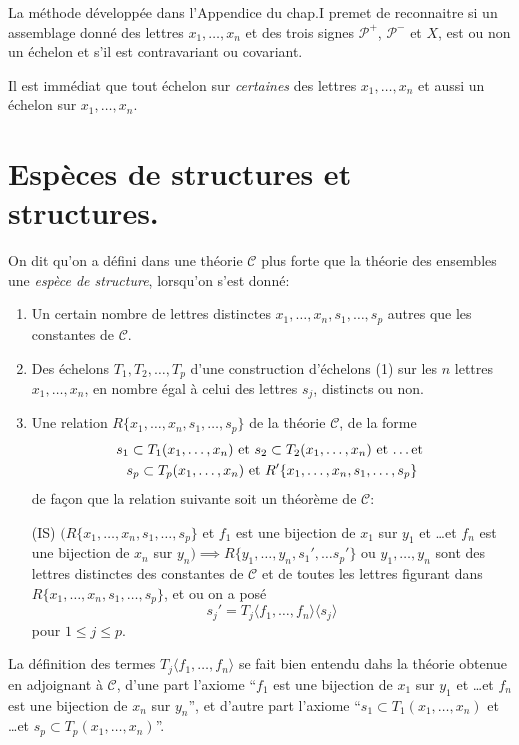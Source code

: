 \documentclass{article}
\newcommand{\C}{\mathcal{C}}
\newcommand{\Pp}{\mathcal{P}^+}
\newcommand{\Pm}{\mathcal{P}^-}
\begin{document}
La m\'ethode d\'evelopp\'ee dans l'Appendice du chap.I premet de
reconnaitre si un assemblage donn\'e des lettres $x_1, \dots, x_n$ et
des trois signes $\Pp$, $\Pm$ et $X$, est ou non un \'echelon et s'il
est contravariant ou covariant.

Il est imm\'ediat que tout \'echelon sur \emph{certaines} des lettres
$x_1, \dots, x_n$ et aussi un \'echelon sur $x_1, \dots, x_n$.

\section*{Esp\`eces de structures et structures.}

On dit qu'on a d\'efini dans une th\'eorie $\C$ plus forte que la
th\'eorie des ensembles une \emph{esp\`ece de structure}, lorsqu'on
s'est donn\'e:
\begin{enumerate}
\item Un certain nombre de lettres distinctes $x_1, \dots, x_n, s_1,
  \dots, s_p$ autres que les constantes de $\C$.
\item Des \'echelons $T_1, T_2, \dots, T_p$ d'une construction
  d'\'echelons (1) sur les $n$ lettres $x_1, \dots, x_n$, en nombre
  \'egal \`a celui des lettres $s_j$, distincts ou non.
\item Une relation $R\{x_1, \dots, x_n, s_1, \dots, s_p\}$ de la
  th\'eorie $\C$, de la forme
  \begin{multline*}
    s_1 \subset T_1(x_1, \dots, x_n) \text{ et } s_2 \subset T_2(x_1,
    \dots, x_n) \text{ et \dots et } \\
    s_p \subset T_p(x_1, \dots, x_n) \text{ et } R'\{x_1, \dots, x_n,
    s_1, \dots, s_p\}
  \end{multline*}
de fa{\c c}on que la relation suivante soit un th\'eor\`eme de $\C$:

(IS) $(R\{x_1, \dots, x_n, s_1, \dots, s_p\}$ et $f_1$ est une
bijection de $x_1$ sur $y_1$ et \dots et $f_n$ est une bijection de
$x_n$ sur $y_n) \implies R\{y_1, \dots, y_n, s_1', \dots s_p'\}$ ou
$y_1, \dots, y_n$ sont des lettres distinctes des constantes de $\C$
et de toutes les lettres figurant dans $R\{x_1, \dots, x_n, s_1,
\dots, s_p\}$, et ou on a pos\'e \[ s_j' = T_j\langle f_1, \dots,
f_n\rangle \langle s_j \rangle \] pour $1 \leq j \leq p$.
\end{enumerate}

La d\'efinition des termes $T_j\langle f_1, \dots, f_n\rangle$ se fait
bien entendu dahs la th\'eorie obtenue en adjoignant \`a $\C$, d'une
part l'axiome ``$f_1$ est une bijection de $x_1$ sur $y_1$ et \dots et
$f_n$ est une bijection de $x_n$ sur $y_n$'', et d'autre part l'axiome
``$s_1 \subset T_1(x_1, \dots, x_n)$ et \dots et $s_p \subset T_p(x_1,
\dots, x_n)$''.
\end{document}
